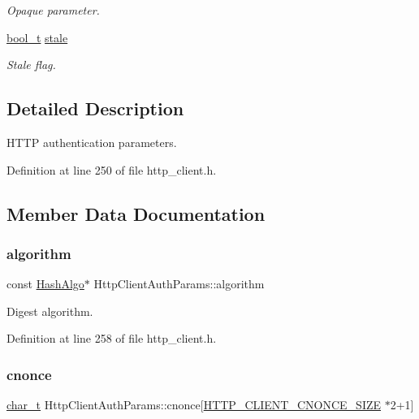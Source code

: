 \begin{DoxyCompactItemize}
\begin{DoxyCompactList}\small\item\em Opaque parameter. \end{DoxyCompactList}\item 
\hyperlink{compiler__port_8h_a812d16e5494522586b3784e55d479912}{bool\+\_\+t} \hyperlink{structHttpClientAuthParams_ae97b6746ab9fbdf4b0cd90e354c75ca8}{stale}
\begin{DoxyCompactList}\small\item\em Stale flag. \end{DoxyCompactList}\end{DoxyCompactItemize}


\subsection{Detailed Description}
H\+T\+TP authentication parameters. 

Definition at line 250 of file http\+\_\+client.\+h.



\subsection{Member Data Documentation}
\mbox{\label{structHttpClientAuthParams_a5fd751d46c8648505a9489c7aa62e655}} 
\subsubsection{\texorpdfstring{algorithm}{algorithm}}
{\footnotesize\ttfamily const \hyperlink{structHashAlgo}{Hash\+Algo}$\ast$ Http\+Client\+Auth\+Params\+::algorithm}



Digest algorithm. 



Definition at line 258 of file http\+\_\+client.\+h.

\mbox{\label{structHttpClientAuthParams_aa1989def27a73aedd87034244415fbf5}} 
\subsubsection{\texorpdfstring{cnonce}{cnonce}}
{\footnotesize\ttfamily \hyperlink{compiler__port_8h_a40bb5262bf908c328fbcfbe5d29d0201}{char\+\_\+t} Http\+Client\+Auth\+Params\+::cnonce\mbox{[}\hyperlink{http__client_8h_aa612d956996c93caa4ccccfef03fc9eb}{H\+T\+T\+P\+\_\+\+C\+L\+I\+E\+N\+T\+\_\+\+C\+N\+O\+N\+C\+E\+\_\+\+S\+I\+ZE} $\ast$2+1\mbox{]}}



